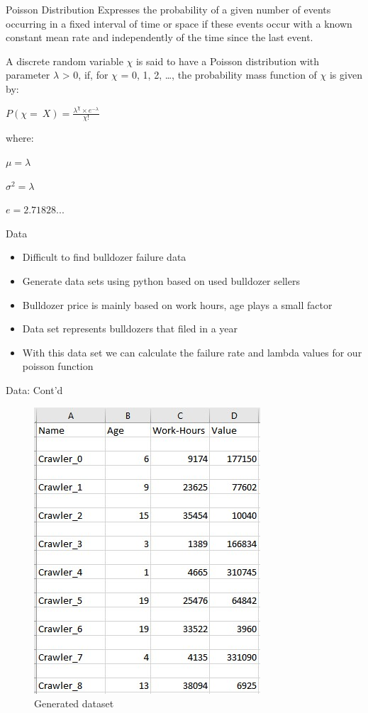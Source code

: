 \documentclass[
  ignorenonframetext,
]{beamer}
\begin{document}
\begin{frame}{Poisson Distribution}
\protect\hypertarget{poisson-distribution}{}
Expresses the probability of a given number of events occurring in a
fixed interval of time or space if these events occur with a known
constant mean rate and independently of the time since the last event.

A discrete random variable \(\chi\) is said to have a Poisson
distribution with parameter \(\lambda\) \textgreater{} 0, if, for
\(\chi\) = 0, 1, 2, \ldots, the probability mass function of \(\chi\) is
given by:

\(P(\chi = \ X) = \frac{\lambda^{\chi} \times e^{-\lambda}}{\chi !}\)

where:

\(\mu = \lambda\)

\(\sigma^{2} = \lambda\)

\(e = 2.71828...\)
\end{frame}

\begin{frame}{Data}
\protect\hypertarget{data}{}
\begin{itemize}
\item
  Difficult to find bulldozer failure data
\item
  Generate data sets using python based on used bulldozer sellers
\item
  Bulldozer price is mainly based on work hours, age plays a small
  factor
\item
  Data set represents bulldozers that filed in a year
\item
  With this data set we can calculate the failure rate and lambda values
  for our poisson function
\end{itemize}
\end{frame}

\begin{frame}{Data: Cont'd}
\protect\hypertarget{data-contd}{}
\begin{figure}
\centering
\includegraphics{./tex2pdf.-3403081cc63b4f47/7032243e87b12bb94f9ce8e7cf0561b5143a28d8.jpg}
\caption{Generated dataset}
\end{figure}
\end{frame}
\end{document}
